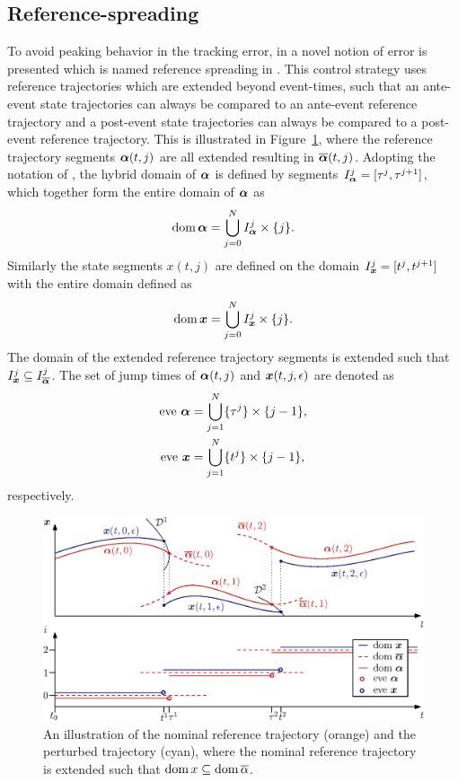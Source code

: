 \documentclass[../DC2017114Bouma.tex]{subfiles}
\begin{document}
\subsection{Reference-spreading}
To avoid peaking behavior in the tracking error, in \cite{Saccon2014} a novel notion of error is presented which is named reference spreading in \cite{Rijnen2016}. This control strategy uses reference trajectories which are extended beyond event-times, such that an ante-event state trajectories can always be compared to an ante-event reference trajectory and a post-event state trajectories can always be compared to a post-event reference trajectory. This is illustrated in Figure~\ref{fig:3refspread}, where the reference trajectory segments $\boldsymbol{\alpha}(t,j)$ are all extended resulting in $\overline{\boldsymbol{\alpha}}(t,j)$. Adopting the notation of \cite{Goebel2009}, the hybrid domain of $\boldsymbol{\alpha}$ is defined by segments $I^j_{\boldsymbol{\alpha}} = [\tau^j,\tau^{j+1}]$, which together form the entire domain of $\boldsymbol{\alpha}$ as
\begin{align}
\operatorname{\textnormal{dom}}\boldsymbol{\alpha} = \bigcup^N_{j=0}I_{\boldsymbol{\alpha}}^j\times\{j\}.
\end{align}
%
Similarly the state segments $x(t,j)$ are defined on the domain $I^j_{\boldsymbol{x}} = [t^j,t^{j+1}]$ with the entire domain defined as
\begin{align}
\operatorname{\textnormal{dom}}{\boldsymbol{x}} = \bigcup^N_{j=0}I_{{\boldsymbol{x}}}^j\times\{j\}.
\end{align}
The domain of the extended reference trajectory segments is extended such that $I_{{\boldsymbol{x}}}^j\subseteq I_{\overline{\boldsymbol{\alpha}}}^j$. The set of jump times of $\boldsymbol{\alpha}(t,j)$ and ${\boldsymbol{x}}(t,j,\epsilon)$ are denoted as
\begin{align}
\text{eve}\ \boldsymbol{\alpha} &= \bigcup_{j=1}^N \{\tau^j\}\times\{j-1\},\\
\text{eve}\ {\boldsymbol{x}} &= \bigcup_{j=1}^N \{t^j\}\times\{j-1\},
\end{align}
respectively.
\begin{figure}[h]
\centering
\includegraphics[width=.9\textwidth]{refspreaddom.eps}\caption{An illustration of the nominal reference trajectory (orange) and the perturbed trajectory (cyan), where the nominal reference trajectory is extended such that $\operatorname{\textnormal{dom}} x\subseteq\operatorname{\textnormal{dom}} \overline{\alpha}$.} \label{fig:3refspread}
\end{figure}
\end{document}
